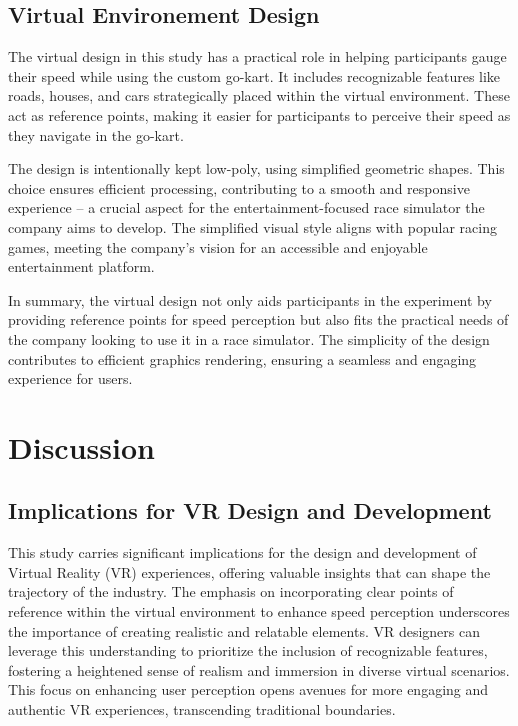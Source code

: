 \documentclass[a4paper, 12pt, oneside]{article}
\begin{document}
        \subsection{Virtual Environement Design}

        The virtual design in this study has a practical role in helping participants gauge their speed while using the custom 
        go-kart. It includes recognizable features like roads, houses, and cars strategically placed within the virtual environment. 
        These act as reference points, making it easier for participants to perceive their speed as they navigate in the go-kart.

        The design is intentionally kept low-poly, using simplified geometric shapes. This choice ensures efficient processing, 
        contributing to a smooth and responsive experience – a crucial aspect for the entertainment-focused race simulator the 
        company aims to develop. The simplified visual style aligns with popular racing games, meeting the company's vision for an 
        accessible and enjoyable entertainment platform.

        In summary, the virtual design not only aids participants in the experiment by providing reference points for speed 
        perception but also fits the practical needs of the company looking to use it in a race simulator. The simplicity of the 
        design contributes to efficient graphics rendering, ensuring a seamless and engaging experience for users.
        

    \section{Discussion}
        \subsection{Implications for VR Design and Development}
        This study carries significant implications for the design and development of Virtual Reality (VR) experiences, offering 
        valuable insights that can shape the trajectory of the industry. The emphasis on incorporating clear points of reference 
        within the virtual environment to enhance speed perception underscores the importance of creating realistic and relatable 
        elements. VR designers can leverage this understanding to prioritize the inclusion of recognizable features, fostering a 
        heightened sense of realism and immersion in diverse virtual scenarios. This focus on enhancing user perception opens 
        avenues for more engaging and authentic VR experiences, transcending traditional boundaries.
\end{document}
